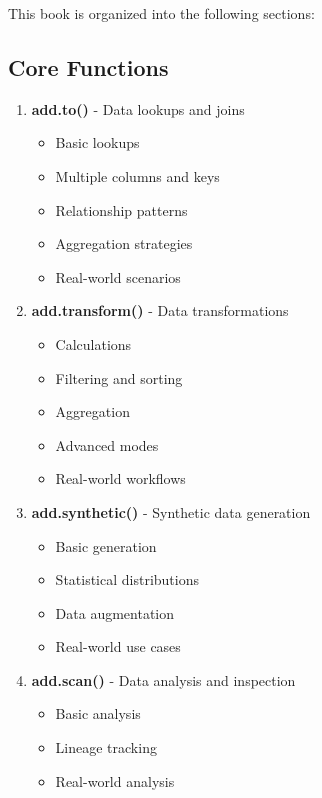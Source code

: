 \documentclass[
  letterpaper,
]{scrbook}
\providecommand{\tightlist}{%
  \setlength{\itemsep}{0pt}\setlength{\parskip}{0pt}}
\begin{document}

This book is organized into the following sections:

\subsection*{Core Functions}\label{core-functions}

\begin{enumerate}
\def\labelenumi{\arabic{enumi}.}
\tightlist
\item
  \textbf{add.to()} - Data lookups and joins

  \begin{itemize}
  \tightlist
  \item
    Basic lookups
  \item
    Multiple columns and keys
  \item
    Relationship patterns
  \item
    Aggregation strategies
  \item
    Real-world scenarios
  \end{itemize}
\item
  \textbf{add.transform()} - Data transformations

  \begin{itemize}
  \tightlist
  \item
    Calculations
  \item
    Filtering and sorting
  \item
    Aggregation
  \item
    Advanced modes
  \item
    Real-world workflows
  \end{itemize}
\item
  \textbf{add.synthetic()} - Synthetic data generation

  \begin{itemize}
  \tightlist
  \item
    Basic generation
  \item
    Statistical distributions
  \item
    Data augmentation
  \item
    Real-world use cases
  \end{itemize}
\item
  \textbf{add.scan()} - Data analysis and inspection

  \begin{itemize}
  \tightlist
  \item
    Basic analysis
  \item
    Lineage tracking
  \item
    Real-world analysis
  \end{itemize}
\end{enumerate}
\end{document}
